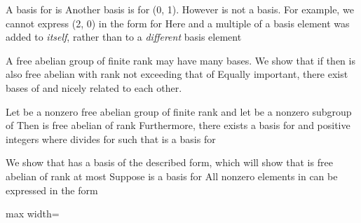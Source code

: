 \documentclass[11pt,oneside]{article}
\begin{document}
\begin{BookBody}
 A basis for  is  Another basis is  for  (0, 1). However is not a basis. For example, we cannot express (2, 0) in the form  for  Here  and a multiple of a basis element was added to\textit{ itself}, rather than to a\textit{ different} basis element\BookEnd{\blacktriangle}

A free abelian group  of finite rank may have many bases. We show that if  then  is also free abelian with rank not exceeding that of  Equally important, there exist bases of  and  nicely related to each other.

 Let  be a nonzero free abelian group of finite rank  and let  be a nonzero subgroup of  Then  is free abelian of rank  Furthermore, there exists a basis  for  and positive integers where  divides  for  such that  is a basis for 

 We show that  has a basis of the described form, which will show that  is free abelian of rank at most  Suppose  is a basis for  All nonzero elements in  can be expressed in the form

\begin{center}\begin{adjustbox}{max width=\linewidth}\end{adjustbox}\end{center}


\end{BookBody}
\end{document}
